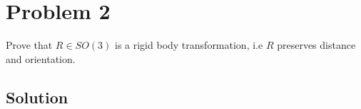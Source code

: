 \section*{Problem 2}

Prove that \(R \in S O(3)\) is a rigid body transformation, i.e \(R\) preserves distance and orientation.

\subsection*{Solution}
